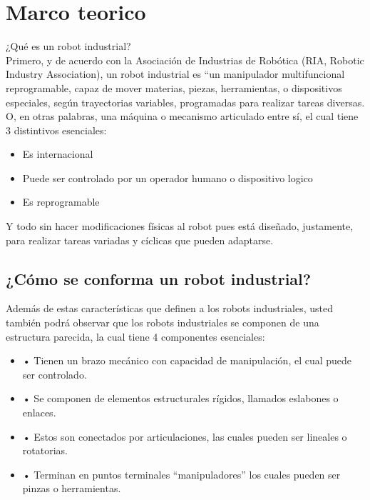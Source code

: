 \documentclass[12pt,letterpaper]{article}
\begin{document}
\section{Marco teorico}
¿Qué es un robot industrial?\\

Primero, y de acuerdo con la Asociación de Industrias de Robótica (RIA, Robotic Industry Association), un robot industrial es “un manipulador multifuncional reprogramable, capaz de mover materias, piezas, herramientas, o dispositivos especiales, según trayectorias variables, programadas para realizar tareas diversas.\\O, en otras palabras, una máquina o mecanismo articulado entre sí, el cual tiene 3 distintivos esenciales:
\begin{itemize}
\item Es internacional
\item Puede ser controlado por un operador humano o dispositivo logico
\item Es reprogramable\\
\end{itemize}
Y todo sin hacer modificaciones físicas al robot pues está diseñado, justamente, para realizar tareas variadas y cíclicas que pueden adaptarse.
\subsection{¿Cómo se conforma un robot industrial?}
Además de estas características que definen a los robots industriales, usted también podrá observar que los robots industriales se componen de una estructura parecida, la cual tiene 4 componentes esenciales:
\begin{itemize}
\item •	Tienen un brazo mecánico con capacidad de manipulación, el cual puede ser controlado.
\item •	Se componen de elementos estructurales rígidos, llamados eslabones o enlaces.
\item •	Estos son conectados por articulaciones, las cuales pueden ser lineales o rotatorias.
\item •	Terminan en puntos terminales “manipuladores” los cuales pueden ser pinzas o herramientas.
\end{itemize}
\end{document}
